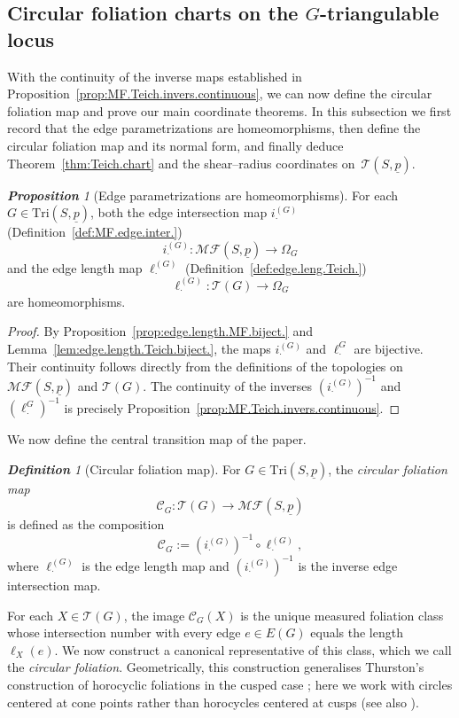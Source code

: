 \documentclass[11pt, letterpaper]{amsart}
\theoremstyle{definition}
\theoremstyle{remark}
\newtheorem{proposition}[theorem]{\rm\bf Proposition}
\newtheorem{definition}[theorem]{\rm\bf Definition}
\newcommand{\up}{\underline{p}}
\newcommand{\Sp}{(S,\up)}
\newcommand{\TSp}{\text{Tri}\Sp}
\newcommand{\iG}{i^{(G)}}
\newcommand{\cMFp}{\mathcal{MF} (S,\up)}
\newcommand{\cC}{\mathcal{C}}
\newcommand{\cT}{\mathcal{T}}
\newcommand{\cTp}{\mathcal{T} (S,\up)}
\newcommand{\DEF}{} \newcommand{\WARN}{\textcolor{red}} \newcommand{\ALT}{\textcolor{brown}} \newcommand{\TODO}{\textcolor{teal}} %
\numberwithin{equation}{section}
\begin{document}
\subsection{Circular foliation charts on the $G$-triangulable locus}
\label{subsec:circ.foli.surf.coor.}

With the continuity of the inverse maps established in
Proposition~\ref{prop:MF.Teich.invers.continuous}, we can now define the
circular foliation map and prove our main coordinate theorems.
In this subsection we first record that the edge parametrizations are
homeomorphisms, then define the circular foliation map and its normal form, and
finally deduce Theorem~\ref{thm:Teich.chart} and the shear--radius coordinates
on~\(\cTp\).

\begin{proposition}[Edge parametrizations are homeomorphisms]
\label{prop:edge.leng.homeo.}
For each \(G \in \TSp\), both the edge intersection map
\(\iG_{\cdot}\) (Definition~\ref{def:MF.edge.inter.})
\[
\iG_{\cdot} : \cMFp \longrightarrow \Omega_G
\]
and the edge length map \(\ell^{(G)}_{\cdot}\) (Definition~\ref{def:edge.leng.Teich.})
\[
\ell^{(G)}_{\cdot}: \cT(G) \longrightarrow \Omega_G
\]
are homeomorphisms.
\end{proposition}

\begin{proof}
By Proposition~\ref{prop:edge.length.MF.biject.} and
Lemma~\ref{lem:edge.length.Teich.biject.}, the maps \(\iG_{\cdot}\) and
\(\ell^G_{\cdot}\) are bijective.
Their continuity follows directly from the definitions of the topologies on
\(\cMFp\) and \(\cT(G)\).
The continuity of the inverses \((\iG_{\cdot})^{-1}\) and
\((\ell^G_{\cdot})^{-1}\) is precisely Proposition~\ref{prop:MF.Teich.invers.continuous}.
\end{proof}

We now define the central transition map of the paper.

\begin{definition}[Circular foliation map]
\label{def:circ.foli.map.}
For \(G \in \TSp\), the \DEF{\em circular foliation map}
\[
\cC_G : \cT(G) \longrightarrow \cMFp
\]
is defined as the composition
\[
\cC_G := (\iG_{\cdot})^{-1} \circ \ell^{(G)}_{\cdot},
\]
where \(\ell^{(G)}_{\cdot}\) is the edge length map and
\((\iG_{\cdot})^{-1}\) is the inverse edge intersection map.
\end{definition}

For each \(X \in \cT(G)\), the image \(\cC_G(X)\) is the unique measured foliation
class whose intersection number with every edge \(e \in E(G)\) equals the length
\(\ell_X(e)\).
We now construct a canonical representative of this class, which we call the
\emph{circular foliation}.
Geometrically, this construction generalises Thurston's construction of horocyclic
foliations in the cusped case \cite[Sec.~4]{Thu98}; here we work with circles
centered at cone points rather than horocycles centered at cusps
(see also \cite[Def.~3.7]{PT07}).
\end{document}
